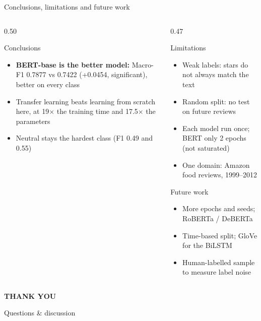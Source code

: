 \documentclass[aspectratio=169,10pt]{beamer}
\begin{document}
\begin{frame}{Conclusions, limitations and future work}
  \begin{columns}[T]
    \begin{column}{0.50\textwidth}
      \begin{block}{Conclusions}
        \small
        \begin{itemize}\setlength{\itemsep}{4pt}
          \item \textbf{BERT-base is the better model:} Macro-F1 0.7877 vs 0.7422 (+0.0454, significant), better on every class
          \item Transfer learning beats learning from scratch here, at 19$\times$ the training time and 17.5$\times$ the parameters
          \item Neutral stays the hardest class (F1 0.49 and 0.55)
        \end{itemize}
      \end{block}
    \end{column}
    \begin{column}{0.47\textwidth}
      \begin{alertblock}{Limitations}
        \footnotesize
        \begin{itemize}\setlength{\itemsep}{2pt}
          \item Weak labels: stars do not always match the text
          \item Random split: no test on future reviews
          \item Each model run once; BERT only 2 epochs (not saturated)
          \item One domain: Amazon food reviews, 1999--2012
        \end{itemize}
      \end{alertblock}
      \begin{exampleblock}{Future work}
        \footnotesize
        \begin{itemize}\setlength{\itemsep}{2pt}
          \item More epochs and seeds; RoBERTa / DeBERTa
          \item Time-based split; GloVe for the BiLSTM
          \item Human-labelled sample to measure label noise
        \end{itemize}
      \end{exampleblock}
    \end{column}
  \end{columns}
\end{frame}

\begin{hustdarkframe}
  \centering
  \vspace*{0.2\paperheight}
  {\Huge\bfseries\color{white} THANK YOU\par}
  \vspace{1.5em}
  {\large\color{white!85} Questions \& discussion\par}
\end{hustdarkframe}
\end{document}
